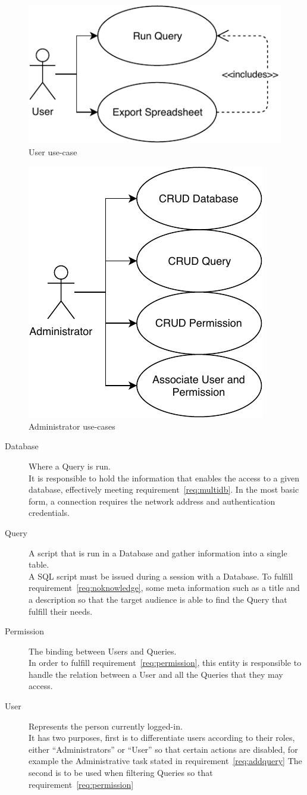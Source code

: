 \begin{figure}[h]
  \centering
  \includegraphics[width=.5\textwidth]{images/diagramas/userusecase}
  \caption{User use-case}\label{fig:userusecase}
\end{figure}

\begin{figure}[h]
  \centering
  \includegraphics[width=.5\textwidth]{images/diagramas/adminusecase}
  \caption{Administrator use-cases}\label{fig:adminusecases}
\end{figure}

\begin{description}
\item[Database] Where a Query is run.\\
  It is responsible to hold the information that enables the access to a given database, effectively meeting requirement~\ref{req:multidb}.
  In the most basic form, a connection requires the network address and authentication credentials.
\item[Query] A script that is run in a Database and gather information into a single table.\\
  A \gls{SQL} script must be issued during a session with a Database.
  To fulfill requirement~\ref{req:noknowledge}, some meta information such as a title and a description so that the target audience is able to find the Query that fulfill their needs.
\item[Permission] The binding between Users and Queries.\\
  In order to fulfill requirement~\ref{req:permission}, this entity is responsible to handle the relation between a User and all the Queries that they may access.
\item[User] Represents the person currently logged-in.\\
  It has two purposes, first is to differentiate users according to their roles, either ``Administrators'' or ``User'' so that certain actions are disabled, for example the Administrative task stated in requirement~\ref{req:addquery}
  The second is to be used when filtering Queries so that requirement~\ref{req:permission}
\end{description}

